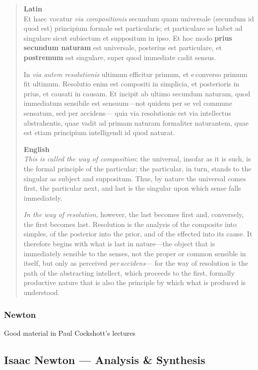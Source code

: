 \begin{quotation}
\textbf{Latin}\\
\small
Et haec vocatur \emph{via compositionis} secundum quam universale (secundum id quod est) principium formale est particularis;  
et particulare se habet ad singulare sicut subiectum et suppositum in ipso.  
Et hoc modo \textbf{prius secundum naturam} est universale, posterius est particulare, et \textbf{postremum} est singulare, super quod immediate cadit sensus.  

In \emph{via autem resolutionis} ultimum efficitur primum, et e converso primum fit ultimum.  
Resolutio enim est compositi in simplicia, et posterioris in prius, et causati in causam.  
Et incipit ab ultimo secundum naturam, quod immediatum sensibile est sensuum—not quidem per se vel commune sensatum, sed per accidens—  
quia via resolutionis est via intellectus abstrahentis, quae vadit ad primam naturam formaliter naturantem, quae est etiam principium intelligendi id quod naturat.

\vspace{0.8em}
\textbf{English}\\
\small
\emph{This is called the way of composition}: the universal, insofar as it is such, is the formal principle of the particular;  
the particular, in turn, stands to the singular as subject and suppositum.  
Thus, by nature the universal comes first, the particular next, and last is the singular upon which sense falls immediately.  

\emph{In the way of resolution}, however, the last becomes first and, conversely, the first becomes last.  
Resolution is the analysis of the composite into simples, of the posterior into the prior, and of the effected into its cause.  
It therefore begins with what is last in nature—the object that is immediately sensible to the senses, not the proper or common sensible in itself, but only as perceived \emph{per accidens}—  
for the way of resolution is the path of the abstracting intellect, which proceeds to the first, formally productive nature that is also the principle by which what is produced is understood.
\end{quotation}


\subsubsection{Newton}
Good material in Paul Cockshott's lectures

\subsection{Isaac Newton --- Analysis \& Synthesis}

